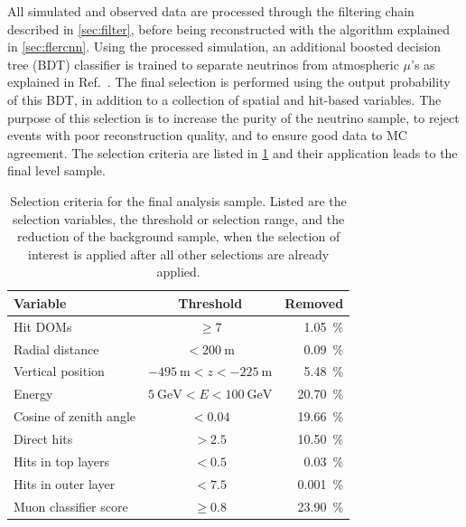\documentclass[
    aps,
    prd,
    reprint,
    amsmath,
    amssymb,
    nofootinbib,
    superscriptaddress,
    floatfix
]{revtex4-2}
\newcommand{\gev}{\giga\electronvolt}
\begin{document}
All simulated and observed data are processed through the filtering chain described in \cref{sec:filter}, before being reconstructed with the algorithm explained in \cref{sec:flercnn}.
Using the processed simulation, an additional boosted decision tree (BDT) classifier is trained to separate neutrinos from atmospheric $\mu$'s as explained in Ref.~\cite{IceCube:2024xjj}.
The final selection is performed using the output probability of this BDT, in addition to a collection of spatial and hit-based variables.
The purpose of this selection is to increase the purity of the neutrino sample, to reject events with poor reconstruction quality, and to ensure good data to MC agreement.
The selection criteria are listed in \cref{tab:analysis_cuts} and their application leads to the final level sample.

\begin{table}[h]
    \footnotesize
        \begin{tabular}{ lcr }
        \hline\hline    
        \textbf{Variable} & \textbf{Threshold} & \textbf{Removed} \\
        \hline\hline    
        Hit DOMs & $\geq 7$ & \SI{1.05}{\percent} \\
        Radial distance & $< \SI{200}{\meter}$ & \SI{0.09}{\percent} \\
        Vertical position & $\SI{-495}{\meter} < z < \SI{-225}{\meter}$ & \SI{5.48}{\percent} \\
        Energy & $\SI{5}{\gev} < E < \SI{100}{\gev}$ & \SI{20.70}{\percent} \\    
        Cosine of zenith angle & $< 0.04$ & \SI{19.66}{\percent} \\
        Direct hits & $> 2.5$ & \SI{10.50}{\percent} \\
        Hits in top layers & $< 0.5$ & \SI{0.03}{\percent} \\
        Hits in outer layer & $< 7.5$ & \SI{0.001}{\percent} \\
        Muon classifier score & $\geq 0.8$ & \SI{23.90}{\percent} \\
        \hline
        \end{tabular}
    \caption{Selection criteria for the final analysis sample. Listed are the selection variables, the threshold or selection range, and the reduction of the background sample, when the selection of interest is applied after all other selections are already applied.}
    \label{tab:analysis_cuts}
\end{table}
\end{document}
